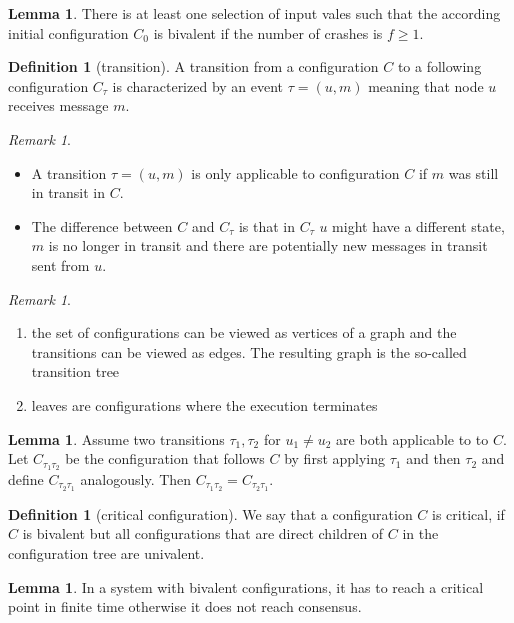 \documentclass[a4paper, 12pt]{article}
\theoremstyle{plain}
\theoremstyle{definition}
\newtheorem{definition}[theorem]{Definition} %
\theoremstyle{lemma}
\newtheorem{lemma}[theorem]{Lemma}
\theoremstyle{remark}
\newtheorem{remark}[theorem]{Remark}
\theoremstyle{corollary}
\theoremstyle{example}
\begin{document}
	\begin{lemma}
		There is at least one selection of input vales such that the according initial configuration $C_0$ is bivalent if the number of crashes is $f\geq 1$.
	\end{lemma}
	\begin{definition}[transition]
		A transition from a configuration $C$ to a following configuration $C_\tau$ is characterized by an event $\tau = (u,m)$ meaning that node $u$ receives message $m$.
	\end{definition}
	\begin{remark}
		\begin{itemize}
			\item A transition $\tau = (u,m)$ is only applicable to configuration $C$ if $m$ was still in transit in $C$.
			\item The difference between $C$ and $C_\tau$ is that in $C_\tau$ $u$ might have a different state, $m$ is no longer in transit and there are potentially new messages in transit sent from $u$.
		\end{itemize}
	\end{remark}
	\begin{remark}
		\begin{enumerate}
			\item the set of configurations can be viewed as vertices of a graph and the transitions can be viewed as edges. The resulting graph is the so-called transition tree
			\item leaves are configurations where the execution terminates
		\end{enumerate}
	\end{remark}
	\begin{lemma}
		Assume two transitions $\tau_1,\tau_2$ for $u_1\neq u_2$ are both applicable to to $C$. Let $C_{\tau_1\tau_2}$ be the configuration that follows $C$ by first applying $\tau_1$ and then $\tau_2$ and define $C_{\tau_2\tau_1}$ analogously. Then $C_{\tau_1\tau_2} = C_{\tau_2\tau_1}$. 
	\end{lemma}
	\begin{definition}[critical configuration]
		We say that a configuration $C$ is critical, if $C$ is bivalent but all configurations that are direct children of $C$ in the configuration tree are univalent.
	\end{definition}
	\begin{lemma}
		In a system with bivalent configurations, it has to reach a critical point in finite time otherwise it does not reach consensus.
	\end{lemma}
\end{document}
